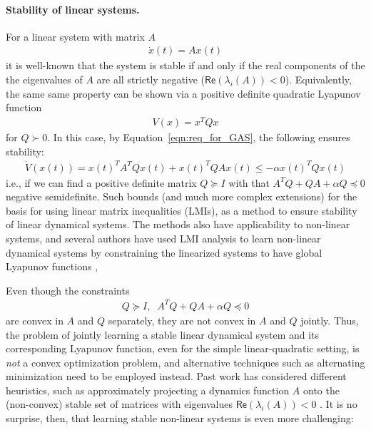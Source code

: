 \paragraph{Stability of linear systems. }
For a linear system with matrix $A$
\begin{align}
	\dot{x}(t) = A x(t)
\end{align}
it is well-known that the system is stable if and only if the real components of the the eigenvalues of $A$ are all strictly negative ($\mathsf{Re}(\lambda_i(A)) < 0$).  Equivalently, the same same property can be shown via a positive definite quadratic Lyapunov function
\begin{align}
	V(x) = x^T Q x
\end{align}
for $Q\succ 0$.  In this case, by Equation~\ref{eqn:req_for_GAS}, the following ensures stability:
\begin{align}
	\dot{V}(x(t)) = x(t)^T A^T Q x(t) + x(t)^T Q A x(t) \leq -\alpha x(t)^T Q x(t)
\end{align}
i.e., if we can find a positive definite matrix $Q \succeq I$ with that $A^T Q + Q A + \alpha Q \preceq 0$ negative semidefinite.  Such bounds (and much more complex extensions) for the basis for using linear matrix inequalities (LMIs), as a method to ensure stability of linear dynamical systems.  The methods also have applicability to non-linear systems, and several authors have used LMI analysis to learn non-linear dynamical systems by constraining the linearized systems to have global Lyapunov functions \cite{khansari2011learning,blocher2017learning,umlauft2017learning},

Even though the constraints
\begin{align}
	Q \succeq I, \;\; A^T Q + Q A + \alpha Q \preceq 0
\end{align}
are convex in $A$ and $Q$ separately, they are not convex in $A$ and $Q$ jointly.  Thus, the problem of jointly learning a stable linear dynamical system and its corresponding Lyapunov function, even for the simple linear-quadratic setting, is \emph{not} a convex optimization problem, and alternative techniques such as alternating minimization need to be employed instead.  Past work has considered different heuristics, such as approximately projecting a dynamics function $A$ onto the (non-convex) stable set of matrices with eigenvalues $\mathsf{Re}(\lambda_i(A)) < 0$ \citep{boots2008constraint}. It is no surprise, then, that learning stable non-linear systems is even more challenging:


